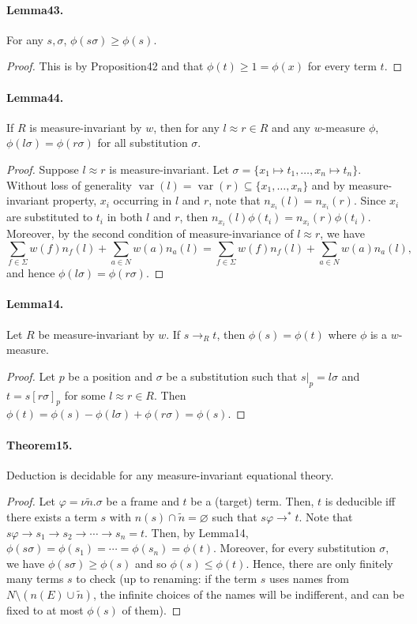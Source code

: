 \documentclass[10pt,a4paper]{amsart}
\begin{document}
\paragraph{Lemma43.} For any $s,\sigma$, $\phi(s\sigma)\ge\phi(s)$.
\begin{proof}This is by Proposition42 and that $\phi(t)\ge1=\phi(x)$ for every term $t$.\end{proof}
\paragraph{Lemma44.} If $R$ is measure-invariant by $w$, then for any $l\approx r\in R$ and any $w$-measure $\phi$, $\phi(l\sigma)=\phi(r\sigma)$ for all substitution $\sigma$.
\begin{proof}
Suppose $l\approx r$ is measure-invariant. Let $\sigma=\{x_1\mapsto t_1,\ldots,x_n\mapsto t_n\}$. Without loss of generality $\operatorname{var}(l)=\operatorname{var}(r)\subseteq\{x_1,\ldots,x_n\}$ and by measure-invariant property, $x_i$ occurring in $l$ and $r$, note that $n_{x_i}(l)=n_{x_i}(r)$.
Since $x_i$ are substituted to $t_i$ in both $l$ and $r$, then $n_{x_i}(l)\phi(t_i)=n_{x_i}(r)\phi(t_i)$.
Moreover, by the second condition of measure-invariance of $l\approx r$, we have
\[
\sum_{f\in\Sigma}w(f)n_f(l)+\sum_{a\in N}w(a)n_a(l)=\sum_{f\in\Sigma}w(f)n_f(l)+\sum_{a\in N}w(a)n_a(l),
\]
and hence $\phi(l\sigma)=\phi(r\sigma)$.
\end{proof}
\paragraph{Lemma14.} Let $R$ be measure-invariant by $w$. If $s\to_Rt$, then $\phi(s)=\phi(t)$ where $\phi$ is a $w$-measure.
\begin{proof}
Let $p$ be a position and $\sigma$ be a substitution such that $s|_p=l\sigma$ and $t=s[r\sigma]_p$ for some $l\approx r\in R$.
Then $\phi(t)=\phi(s)-\phi(l\sigma)+\phi(r\sigma)=\phi(s)$.
\end{proof}
\paragraph{Theorem15.} Deduction is decidable for any measure-invariant equational theory.
\begin{proof}
Let $\varphi=\nu\tilde n.\sigma$ be a frame and $t$ be a (target) term. Then, $t$ is deducible iff there exists a term $s$ with $n(s)\cap\tilde n=\varnothing$ such that $s\varphi\to^*t$.
Note that $s\varphi\to s_1\to s_2\to\cdots\to s_n=t$.
Then, by Lemma14, $\phi(s\sigma)=\phi(s_1)=\cdots=\phi(s_n)=\phi(t)$.
Moreover, for every substitution $\sigma$, we have $\phi(s\sigma)\ge\phi(s)$ and so $\phi(s)\le\phi(t)$.
Hence, there are only finitely many terms $s$ to check (up to renaming: if the term $s$ uses names from $N\setminus(n(E)\cup\tilde n)$, the infinite choices of the names will be indifferent, and can be fixed to at most $\phi(s)$ of them).
\end{proof}
\end{document}
